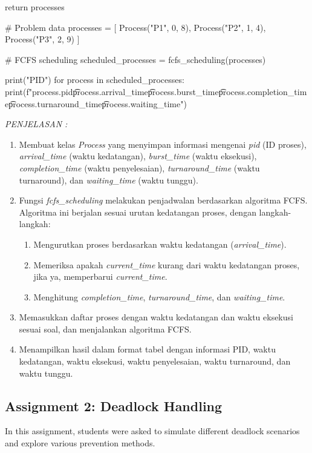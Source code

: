 \documentclass[12pt]{article}
\begin{document}
\begin{enumerate}
\begin{python}
    return processes

# Problem data
processes = [
    Process("P1", 0, 8),
    Process("P2", 1, 4),
    Process("P3", 2, 9)
]

# FCFS scheduling
scheduled_processes = fcfs_scheduling(processes)

print("PID\tArrival\tBurst\tCompletion\tTurnaround\tWaiting")
for process in scheduled_processes:
    print(f"{process.pid}\t{process.arrival_time}\t{process.burst_time}\t{process.completion_time}\t{process.turnaround_time}\t{process.waiting_time}")
\end{python}

\textit{PENJELASAN : }
\begin{enumerate}
    \item Membuat kelas \textit{Process} yang menyimpan informasi mengenai \textit{pid} (ID proses), \textit{arrival\_time} (waktu kedatangan), \textit{burst\_time} (waktu eksekusi), \textit{completion\_time} (waktu penyelesaian), \textit{turnaround\_time} (waktu turnaround), dan \textit{waiting\_time} (waktu tunggu).
    \item Fungsi \textit{fcfs\_scheduling} melakukan penjadwalan berdasarkan algoritma FCFS. Algoritma ini berjalan sesuai urutan kedatangan proses, dengan langkah-langkah:
        \begin{enumerate}
            \item Mengurutkan proses berdasarkan waktu kedatangan (\textit{arrival\_time}).
            \item Memeriksa apakah \textit{current\_time} kurang dari waktu kedatangan proses, jika ya, memperbarui \textit{current\_time}.
            \item Menghitung \textit{completion\_time}, \textit{turnaround\_time}, dan \textit{waiting\_time}.
        \end{enumerate}
    \item Memasukkan daftar proses dengan waktu kedatangan dan waktu eksekusi sesuai soal, dan menjalankan algoritma FCFS.
    \item Menampilkan hasil dalam format tabel dengan informasi PID, waktu kedatangan, waktu eksekusi, waktu penyelesaian, waktu turnaround, dan waktu tunggu.
\end{enumerate}
\end{enumerate}


\subsection{Assignment 2: Deadlock Handling}
In this assignment, students were asked to simulate different deadlock scenarios and explore various prevention methods.
\end{document}
